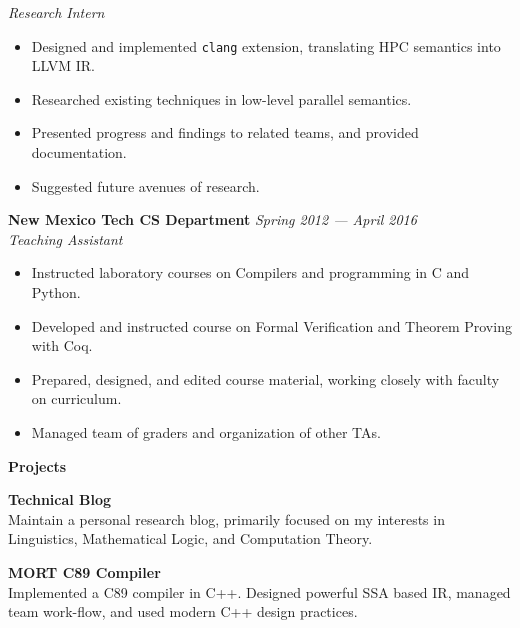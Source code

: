 \documentclass[11pt,a4paper,sans]{article}
\newcommand{\cvcolor}[1]{{\color{MidnightBlue}#1}}
\renewcommand{\section}[1]{
  \cvcolor{\noindent \textbf{\LARGE #1}}
  \vspace{.5em}\\
}
\begin{document}
\textsl{Research Intern}
\begin{itemize}
  \item Designed and implemented \texttt{clang} extension, translating HPC semantics into LLVM IR.
  \item Researched existing techniques in low-level parallel semantics.
  \item Presented progress and findings to related teams, and provided documentation.
  \item Suggested future avenues of research.
\end{itemize}
\vspace{0.2em}
\textbf{New Mexico Tech CS Department} \hfill \textsl{Spring 2012 --- April 2016}\\
\textsl{Teaching Assistant}
\begin{itemize}
  \item Instructed laboratory courses on Compilers and programming in C and
    Python.
  \item Developed and instructed course on Formal Verification and Theorem Proving with Coq.
  \item Prepared, designed, and edited course material, working closely with
    faculty on curriculum.
  \item Managed team of graders and organization of other TAs.
\end{itemize}
\vspace{0.5em}

\section{Projects}
\vspace{-2.5em}
\begin{multicols}{2}

  \noindent
  \textbf{Technical Blog}\\
  Maintain a personal research blog, primarily focused on my interests in
  Linguistics, Mathematical Logic, and Computation Theory.

  \columnbreak

  \noindent
  \textbf{MORT C89 Compiler}\\
  Implemented a C89 compiler in C++. Designed powerful SSA based IR,
  managed team work-flow, and used modern C++ design practices.\\

\end{multicols}
\end{document}
